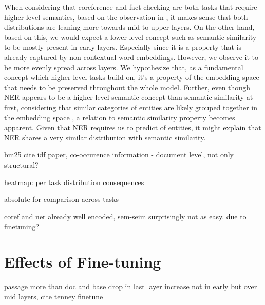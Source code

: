 When considering that coreference and fact checking are both tasks that require higher level semantics, based on the observation in \cite{tenney-etal-2019-bert}, it makes sense that both distributions are leaning more towards mid to upper layers. On the other hand, based on this, we would expect a lower level concept such as semantic similarity to be mostly present in early layers. Especially since it is a property that is already captured by non-contextual word embeddings. However, we observe it to be more evenly spread across layers. We hypothesize that, as a fundamental concept which higher level tasks build on, it's a property of the embedding space that needs to be preserved throughout the whole model.
Further, even though NER appears to be a higher level semantic concept than semantic similarity at first, considering that similar categories of entities are likely grouped together in the embedding space \cite{DBLP:journals/corr/abs-1301-3781, pennington2014glove}, a relation to semantic similarity property becomes apparent. Given that NER requires us to predict  of entities, it might explain that NER shares a very similar distribution with semantic similarity.



bm25 cite idf paper, co-occurence information - document level, not only structural?



heatmap: per task distribution consequences

absolute for comparison across tasks

coref and ner already well encoded, sem-seim surprisingly not as easy. due to finetuning?

\section{Effects of Fine-tuning}
passage more than doc and base
drop in last layer
increase not in early but over mid layers, cite tenney finetune



